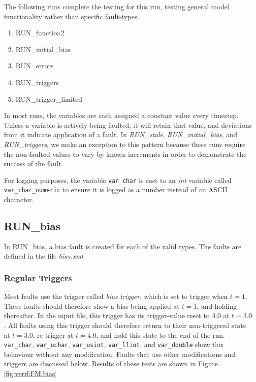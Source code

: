 \documentclass[11pt,fleqn]{report}
\begin{document}
The following runs complete the testing for this run, testing general model
functionality rather than specific fault-types.
\begin{enumerate}[resume]
\item RUN\_function2
\item RUN\_initial\_bias
\item RUN\_errors
\item RUN\_triggers
\item RUN\_trigger\_limited
\end{enumerate}

In most runs, the variables are each assigned a constant value every timestep.
Unless a variable is actively being faulted, it will retain that value, and
deviations from it indicate application of a fault.
In \textit{RUN\_stale}, \textit{RUN\_initial\_bias}, and \textit{RUN\_triggers},
we make an exception to this pattern
because these runs require the non-faulted values to vary by known increments
in order to demonstrate the success of the fault.

For logging purposes, the variable \verb"var_char" is cast to an
\textit{int} variable called \verb"var_char_numeric" to ensure
it is logged as a number instead of an ASCII character.

\subsection{RUN\_bias} \label{sec:verif:FM:bias}
\par In RUN\_bias, a bias fault is created for each of the valid types. The
faults are defined in the file \textit{bias.xml}.

\subsubsection{ Regular Triggers}
Most faults use the trigger called \textit{bias trigger}, which is set to
trigger when $t=1$. These faults should therefore show a bias being
applied at $t=1$, and holding thereafter.
In the input file, this trigger has its
trigger-value reset to 4.0 at $t=3.0$. All faults using this trigger should
therefore return to their non-triggered state at $t=3.0$, re-trigger at $t=4.0$,
and hold this state to the end of the run.
\verb"var_char", \verb"var_uchar", \verb"var_usint", \verb"var_llint", and
\verb"var_double" show this behaviour without any modification.
Faults that use other modifications and triggers are discussed below.
Results of these tests are shown in Figure \ref{fig:verif:FM:bias}
\end{document}
